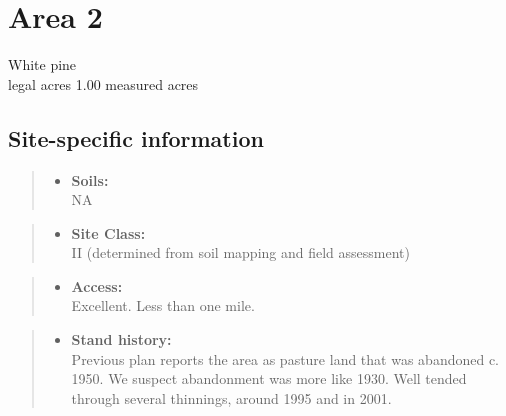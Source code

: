 \documentclass[]{tufte-handout}
\providecommand{\tightlist}{%
  \setlength{\itemsep}{0pt}\setlength{\parskip}{0pt}}
\begin{document}
\section{Area 2}\label{area-2}

White pine\\
 legal acres \textbar{} 1.00 measured acres

\subsection{Site-specific
information}\label{site-specific-information-1}

\begin{quote}
\begin{itemize}
\tightlist
\item
  \textbf{Soils:}\\
  \indent\indent  NA
\end{itemize}
\end{quote}

\begin{quote}
\begin{itemize}
\tightlist
\item
  \textbf{Site Class:}\\
  \vspace{2pt} II (determined from soil mapping and field assessment)
\end{itemize}
\end{quote}

\begin{quote}
\begin{itemize}
\tightlist
\item
  \textbf{Access:}\\
  \vspace{2pt} Excellent. Less than one mile.
\end{itemize}
\end{quote}

\begin{quote}
\begin{itemize}
\tightlist
\item
  \textbf{Stand history:}\\
  \vspace{2pt} Previous plan reports the area as pasture land that was
  abandoned c. 1950. We suspect abandonment was more like 1930. Well
  tended through several thinnings, around 1995 and in 2001.
\end{itemize}
\end{quote}
\end{document}
